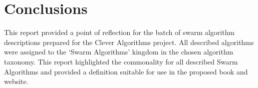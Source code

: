 \documentclass[a4paper, 11pt]{article}
\begin{document}
% 
% 
\section{Conclusions}
\label{sec:conclusions}
This report provided a point of reflection for the batch of swarm algorithm descriptions prepared for the Clever Algorithms project. All described algorithms were assigned to the `Swarm Algorithms' kingdom in the chosen algorithm taxonomy. This report highlighted the commonality for all described Swarm Algorithms and provided a definition suitable for use in the proposed book and website.



\end{document}
